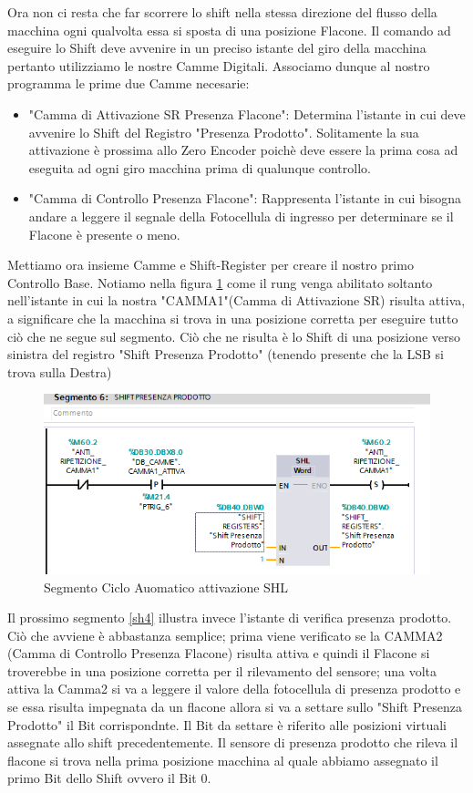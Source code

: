 \documentclass[12pt, a4paper, oneside]{book}
\begin{document}
Ora non ci resta che far scorrere lo shift nella stessa direzione del flusso della macchina ogni qualvolta essa si sposta di una posizione Flacone. Il comando ad eseguire lo Shift deve avvenire in un preciso istante del giro della macchina pertanto utilizziamo le nostre Camme Digitali. Associamo dunque al nostro programma le prime due Camme necesarie:

\begin{itemize}
	\item "Camma di Attivazione SR Presenza Flacone": Determina l'istante in cui deve avvenire lo Shift del Registro "Presenza Prodotto". Solitamente la sua attivazione è prossima allo Zero Encoder poichè deve essere la prima cosa ad eseguita ad ogni giro macchina prima di qualunque controllo.
	\item "Camma di Controllo Presenza Flacone": Rappresenta l'istante in cui bisogna andare a leggere il segnale della Fotocellula di ingresso per determinare se il Flacone è presente o meno.
\end{itemize}

Mettiamo ora insieme Camme e Shift-Register per creare il nostro primo Controllo Base. Notiamo nella figura \ref{sh3} come il rung venga abilitato soltanto nell'istante in cui la nostra "CAMMA1"(Camma di Attivazione SR) risulta attiva, a significare che la macchina si trova in una posizione corretta per eseguire tutto ciò che ne segue sul segmento. Ciò che ne risulta è lo Shift di una posizione verso sinistra del registro "Shift Presenza Prodotto" (tenendo presente che la LSB si trova sulla Destra)


\begin{figure}[H]
	\centering
	\includegraphics[width=12cm]{Immagini/SH3}
	\caption{ Segmento Ciclo Auomatico attivazione SHL}
	\label{sh3}
\end{figure}

Il prossimo segmento \ref{sh4} illustra invece l'istante di verifica presenza prodotto. Ciò che avviene è abbastanza semplice; prima viene verificato se la CAMMA2 (Camma di Controllo Presenza Flacone) risulta attiva e quindi il Flacone si troverebbe in una posizione corretta per il rilevamento del sensore; una volta attiva la Camma2 si va a leggere il valore della fotocellula di presenza prodotto e se essa risulta impegnata da un flacone allora si va a settare sullo "Shift Presenza Prodotto" il Bit corrispondnte. Il Bit da settare è riferito alle posizioni virtuali assegnate allo shift precedentemente. Il sensore di presenza prodotto che rileva il flacone si trova nella prima posizione macchina al quale abbiamo assegnato il primo Bit dello Shift ovvero il Bit 0. 
\end{document}
